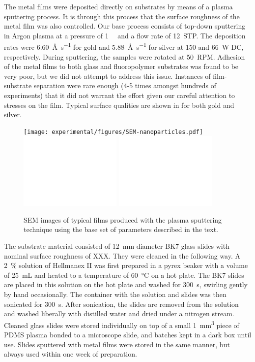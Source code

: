 The metal films were deposited directly on substrates by means of a plasma
sputtering process.  It is through this process that the surface roughness
of the metal film was also controlled.  Our base process consists of
top-down sputtering in Argon plasma at a pressure of \SI{1}{\milli\torr}
and a flow rate of \SI{12}{STP}.  The deposition rates were
\SI{6.60}{\angstrom\per\second} for gold and
\SI{5.88}{\angstrom\per\second} for silver at 150 and \SI{66}{\watt} DC,
respectively.  During sputtering, the samples were rotated at \SI{50}{RPM}.
Adhesion of the metal films to both glass and fluoropolymer substrates was
found to be very poor, but we did not attempt to address this issue.
Instances of film-substrate separation were rare enough (4-5 times amongst
hundreds of experiments) that it did not warrant the effort given our
careful attention to stresses on the film.  Typical surface qualities are
shown in  for both gold and silver.  
\begin{figure}
\centering
\texttt{[image: experimental/figures/SEM-nanoparticles.pdf]}
\includegraphics[keepaspectratio,width=5cm]{experimental/figures/SEM-holesa.pdf}
\includegraphics[keepaspectratio,width=5cm]{experimental/figures/SEM-holesb.pdf}
\caption{SEM images of typical films produced with the plasma sputtering
technique using the base set of parameters described in the text.}
\label{fig:semsputter}
\end{figure}

The substrate material consisted of \SI{12}{\milli\meter} diameter BK7
glass slides with nominal surface roughness of XXX.  They were cleaned in
the following way.  A \SI{2}{\percent} solution of Hellmanex II was first
prepared in a pyrex beaker with a volume of \SI{25}{\milli\liter} and
heated to a temperature of \SI{60}{\celsius} on a hot plate.  The BK7
slides are placed in this solution on the hot plate and washed for
\SI{300}{\second}, swirling gently by hand occasionally.  The container
with the solution and slides was then sonicated for \SI{300}{\second}.
After sonication, the slides are removed from the solution and washed
liberally with distilled water and dried under a nitrogen stream.  Cleaned
glass slides were stored individually on top of a small
\SI{1}{\milli\meter\cubed} piece of PDMS plasma bonded to a microscope
slide, and batches kept in a dark box until use.  Slides sputtered with
metal films were stored in the same manner, but always used within one week
of preparation.


